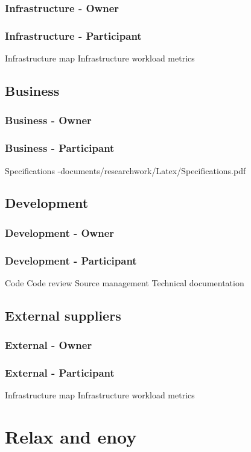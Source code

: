 \documentclass[8pt]{article} %
\begin{document}
\subsubsection{Infrastructure - Owner}
\subsubsection{Infrastructure - Participant}
Infrastructure map
Infrastructure workload metrics

\subsection{Business}
\subsubsection{Business - Owner}
\subsubsection{Business - Participant}
Specifications -documents/researchwork/Latex/Specifications.pdf

\subsection{Development}
\subsubsection{Development - Owner}
\subsubsection{Development - Participant}
Code
Code review
Source management
Technical documentation

\subsection{External suppliers}
\subsubsection{External - Owner}
\subsubsection{External - Participant}
Infrastructure map
Infrastructure workload metrics

\section{Relax and enoy}
\end{document}
